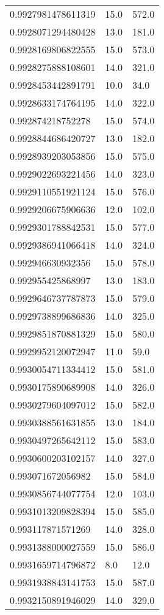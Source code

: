 \begin{center}
\begin{supertabular}[H]{p{0.30\textwidth}p{0.05\textwidth}p{0.05\textwidth}}
0.9927981478611319 & 15.0 & 572.0 \\ 
0.9928071294480428 & 13.0 & 181.0 \\ 
0.9928169806822555 & 15.0 & 573.0 \\ 
0.9928275888108601 & 14.0 & 321.0 \\ 
0.9928453442891791 & 10.0 & 34.0 \\ 
0.9928633174764195 & 14.0 & 322.0 \\ 
0.992874218752278 & 15.0 & 574.0 \\ 
0.9928844686420727 & 13.0 & 182.0 \\ 
0.9928939203053856 & 15.0 & 575.0 \\ 
0.9929022693221456 & 14.0 & 323.0 \\ 
0.9929110551921124 & 15.0 & 576.0 \\ 
0.9929206675906636 & 12.0 & 102.0 \\ 
0.9929301788842531 & 15.0 & 577.0 \\ 
0.9929386941066418 & 14.0 & 324.0 \\ 
0.992946630932356 & 15.0 & 578.0 \\ 
0.992955425868997 & 13.0 & 183.0 \\ 
0.9929646737787873 & 15.0 & 579.0 \\ 
0.9929738899686836 & 14.0 & 325.0 \\ 
0.9929851870881329 & 15.0 & 580.0 \\ 
0.9929952120072947 & 11.0 & 59.0 \\ 
0.9930054711334412 & 15.0 & 581.0 \\ 
0.9930175890689908 & 14.0 & 326.0 \\ 
0.9930279604097012 & 15.0 & 582.0 \\ 
0.9930388561631855 & 13.0 & 184.0 \\ 
0.9930497265642112 & 15.0 & 583.0 \\ 
0.9930600203102157 & 14.0 & 327.0 \\ 
0.993071672056982 & 15.0 & 584.0 \\ 
0.9930856744077754 & 12.0 & 103.0 \\ 
0.9931013209828394 & 15.0 & 585.0 \\ 
0.993117871571269 & 14.0 & 328.0 \\ 
0.9931388000027559 & 15.0 & 586.0 \\ 
0.9931659714796872 & 8.0 & 12.0 \\ 
0.9931938843141753 & 15.0 & 587.0 \\ 
0.9932150891946029 & 14.0 & 329.0 \\ 

\end{supertabular}
\end{center}
